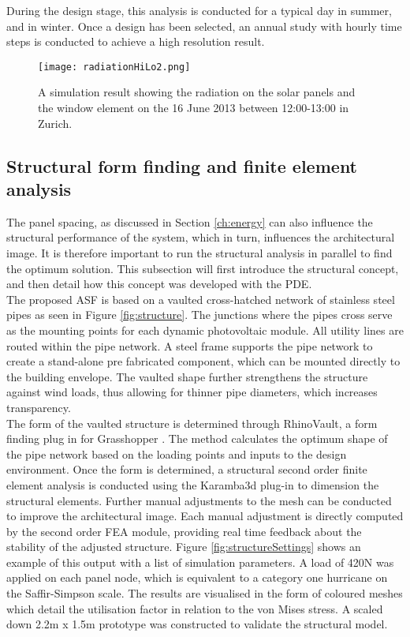 During the design stage, this analysis is conducted for a typical day in summer, and in winter. Once a design has been selected, an annual study with hourly time steps is conducted to achieve a high resolution result.


\begin{figure}
\begin{center}
\texttt{[image: radiationHiLo2.png]}
\caption{A simulation result showing the radiation on the solar panels and the window element on the 16 June 2013 between 12:00-13:00 in Zurich.}
\label{fig:radiation}
\end{center}
\end{figure}


\subsection{Structural form finding and finite element analysis}

The panel spacing, as discussed in Section \ref{ch:energy} can also influence the structural performance of the system, which in turn, influences the architectural image. It is therefore important to run the structural analysis in parallel to find the optimum solution. This subsection will first introduce the structural concept, and then detail how this concept was developed with the PDE.\\

The proposed ASF is based on a vaulted cross-hatched network of stainless steel pipes as seen in Figure \ref{fig:structure}. The junctions where the pipes cross serve as the mounting points for each dynamic photovoltaic module. All utility lines are routed within the pipe network. A steel frame supports the pipe network to create a stand-alone pre fabricated component, which can be mounted directly to the building envelope. The vaulted shape further strengthens the structure against wind loads, thus allowing for thinner pipe diameters, which increases transparency. \\


The form of the vaulted structure is determined through RhinoVault, a form finding plug in for Grasshopper \cite{Rippmann2012}. The method calculates the optimum shape of the pipe network based on the loading points and inputs to the design environment. Once the form is determined, a structural second order finite element analysis is conducted using the Karamba3d plug-in \cite{karamba} to dimension the structural elements. Further manual adjustments to the mesh can be conducted to improve the architectural image. Each manual adjustment is directly computed by the second order FEA module, providing real time feedback about the stability of the adjusted structure.  Figure \ref{fig:structureSettings} shows an example of this output with a list of simulation parameters. A load of 420N was applied on each panel node, which is equivalent to a category one hurricane on the Saffir-Simpson scale. The results are visualised in the form of coloured meshes which detail the utilisation factor in relation to the von Mises stress. A scaled down 2.2m x 1.5m prototype was constructed to validate the structural model. 

